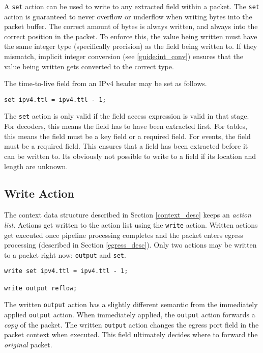 A \texttt{set} action can be used to write to any extracted field within a
packet. 
The \texttt{set} action is guaranteed to never overflow or underflow when
writing bytes into the packet buffer.
The correct amount of bytes is always written, and always into the correct position in the packet.
To enforce this, the value being written must have the same integer type (specifically precision) as the field being written to. If they mismatch, implicit integer conversion (see \ref{guide:int_conv}) ensures that the value being written gets converted to the correct type.

The time-to-live field from an IPv4 header may be set as follows.

\begin{codepage}
\begin{lstlisting}
set ipv4.ttl = ipv4.ttl - 1;
\end{lstlisting}
\end{codepage}

The \texttt{set} action is only valid if the field access expression is valid in
that stage. For decoders, this means the field has to have been extracted first.
For tables, this means the field must be a key field or a required field. For
events, the field must be a required field. This ensures that a field
has been extracted before it can be written to. Its obviously not possible
to write to a field if its location and length are unknown.

\subsection{Write Action} \label{tut:write_action}

The context data structure described in Section \ref{context_desc} keeps an
\textit{action list}. Actions get written to the action list using the
\texttt{write} action. Written actions get executed once pipeline processing
completes and the packet enters egress processing (described in Section \ref{egress_desc}).
Only two actions may be written to a packet right now: \texttt{output} and \texttt{set}.

\begin{codepage}
\begin{lstlisting}
write set ipv4.ttl = ipv4.ttl - 1;

write output reflow;
\end{lstlisting}
\end{codepage}

The written \texttt{output} action has a slightly different semantic from the immediately
applied \texttt{output} action. When immediately applied, the \texttt{output} action forwards a
\textit{copy} of the packet. The written \texttt{output} action changes the egress port field
in the packet context when executed. This field ultimately decides where to forward the
\textit{original} packet.


